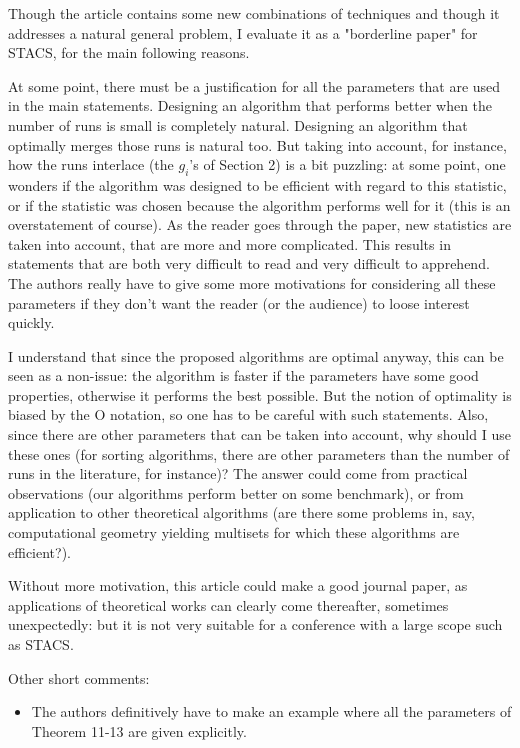 \begin{appendices}
  Though the article contains some new combinations of techniques and
  though it addresses a natural general problem, I evaluate it as a
  "borderline paper" for STACS, for the main following reasons.

  At some point, there must be a justification for all the parameters
  that are used in the main statements. Designing an algorithm that
  performs better when the number of runs is small is completely
  natural. Designing an algorithm that optimally merges those runs is
  natural too. But taking into account, for instance, how the runs
  interlace (the $g_i$'s of Section 2) is a bit puzzling: at some point,
  one wonders if the algorithm was designed to be efficient with
  regard to this statistic, or if the statistic was chosen because the
  algorithm performs well for it (this is an overstatement of
  course). As the reader goes through the paper, new statistics are
  taken into account, that are more and more complicated. This results
  in statements that are both very difficult to read and very
  difficult to apprehend. The authors really have to give some more
  motivations for considering all these parameters if they don't want
  the reader (or the audience) to loose interest quickly.

  I understand that since the proposed algorithms are optimal anyway,
  this can be seen as a non-issue: the algorithm is faster if the
  parameters have some good properties, otherwise it performs the best
  possible. But the notion of optimality is biased by the O notation,
  so one has to be careful with such statements. Also, since there are
  other parameters that can be taken into account, why should I use
  these ones (for sorting algorithms, there are other parameters than
  the number of runs in the literature, for instance)? The answer
  could come from practical observations (our algorithms perform
  better on some benchmark), or from application to other theoretical
  algorithms (are there some problems in, say, computational geometry
  yielding multisets for which these algorithms are efficient?).

  Without more motivation, this article could make a good journal
  paper, as applications of theoretical works can clearly come
  thereafter, sometimes unexpectedly: but it is not very suitable for
  a conference with a large scope such as STACS.

  Other short comments:
  \begin{itemize}
  \item The authors definitively have to make an example where all
    the parameters of Theorem 11-13 are given explicitly.
    

\end{itemize}
\end{appendices}
